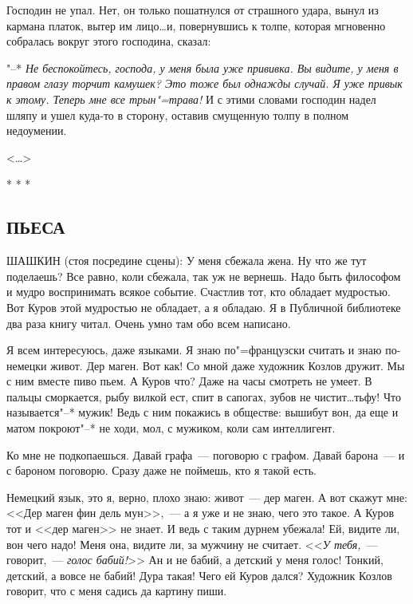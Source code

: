 \documentclass{article}
\begin{document}
Господин не упал. Нет, он только пошатнулся от страшного удара, вынул из кармана платок, вытер им лицо\dots и, повернувшись к толпе, которая мгновенно собралась вокруг 
этого господина, сказал:

"--* \textit{Не беспокойтесь, господа,  у меня была уже  прививка.  Вы видите,  у меня в правом глазу торчит камушек?  Это тоже был однажды случай. Я уже привык к этому. Теперь мне все трын"=трава!} И с этими словами господин надел шляпу и ушел  куда-то  в сторону, оставив  смущенную толпу в полном недоумении.

\begin{flushright}<\dots>\end{flushright}

\begin{center}* * *\end{center}

\begin{center}\subsection*{\textbf{ПЬЕСА}}\end{center}

ШАШКИН (стоя посредине сцены): У меня сбежала жена. Ну что же тут поделаешь? Все равно, коли сбежала, так уж не вернешь. Надо быть философом и мудро  воспринимать всякое событие. Счастлив тот,  кто обладает  мудростью. Вот Куров этой мудростью не обладает, а я обладаю. Я в Публичной библиотеке два раза  книгу читал. Очень умно там обо  всем написано.

Я всем интересуюсь, даже языками. Я знаю по"=французски считать и знаю по-немецки  живот. Дер маген. Вот как! Со мной даже художник  Козлов  дружит.  Мы  с  ним вместе пиво пьем. А Куров что? Даже на часы  смотреть не умеет. В пальцы сморкается, рыбу вилкой ест, спит в сапогах, зубов не чистит\dots тьфу! Что
называется"--* мужик!  Ведь с ним  покажись  в обществе: вышибут вон, да еще и матом покроют"--*  не ходи, мол, с мужиком, коли сам интеллигент.

Ко  мне не подкопаешься.  Давай графа~--- поговорю с графом. Давай барона~--- и с бароном поговорю. Сразу даже не поймешь,  кто  я такой есть.

Немецкий язык, это я, верно, плохо знаю: живот~--- дер маген. А вот  скажут мне: <<Дер маген фин дель мун>>,~--- а  я уже и не знаю, чего это такое. А Куров тот и <<дер маген>> не знает. И ведь с таким дурнем  убежала! Ей, видите ли, вон чего надо! Меня она, видите ли, за мужчину не считает. <<\textit{У тебя,}~--- говорит,~--- \textit{голос бабий!}>> Ан и не бабий,  а  детский у меня голос! Тонкий, детский, а вовсе не бабий! Дура такая! Чего ей Куров дался? Художник  Козлов говорит, что с меня садись да картину пиши.
\end{document}
